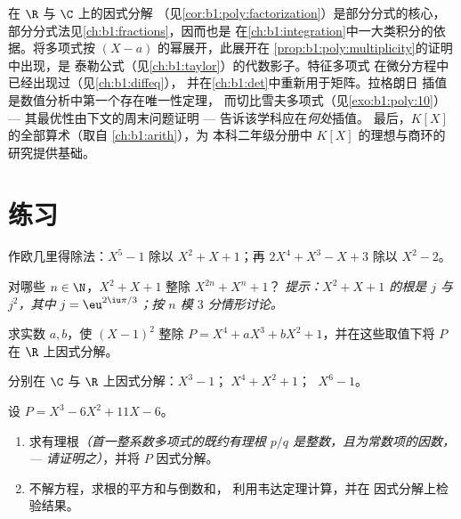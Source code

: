 \begin{remark}[本章的应用]\label{rem:b1:poly:whereused}
在 $\R$ 与 $\C$ 上的因式分解
（见\cref{cor:b1:poly:factorization}）是部分分式的核心，
部分分式法见\cref{ch:b1:fractions}，因而也是
在\cref{ch:b1:integration}中一大类积分的依据。将多项式按
$(X - a)$ 的幂展开，此展开在
\cref{prop:b1:poly:multiplicity}的证明中出现，是
泰勒公式（见\cref{ch:b1:taylor}）的代数影子。特征多项式
在微分方程中已经出现过（见\cref{ch:b1:diffeq}），
并在\cref{ch:b1:det}中重新用于矩阵。拉格朗日
插值是数值分析中第一个存在唯一性定理，
而切比雪夫多项式（见\cref{exo:b1:poly:10}）
--- 其最优性由下文的周末问题证明 ---
告诉该学科应在\emph{何处}插值。
最后，$K[X]$ 的全部算术（取自
\cref{ch:b1:arith}），为
本科二年级分册中 $K[X]$ 的理想与商环的研究提供基础。
\end{remark}

\section{练习}

\begin{exercise}[$\star$]\label{exo:b1:poly:1}
作欧几里得除法：$X^5 - 1$ 除以 $X^2 + X + 1$；再
$2X^4 + X^3 - X + 3$ 除以 $X^2 - 2$。
\end{exercise}

\begin{exercise}[$\star$]\label{exo:b1:poly:2}
对哪些 $n \in \N$，$X^2 + X + 1$ 整除 $X^{2n} + X^n + 1$？
\emph{提示：$X^2 + X + 1$ 的根是 $j$ 与 $j^2$，其中 $j =
\eu^{2\iu\pi/3}$；按 $n$ 模 $3$ 分情形讨论。}
\end{exercise}

\begin{exercise}[$\star$]\label{exo:b1:poly:3}
求实数 $a, b$，使 $(X-1)^2$ 整除 $P = X^4 + aX^3 +
bX^2 + 1$，并在这些取值下将 $P$ 在 $\R$ 上因式分解。
\end{exercise}

\begin{exercise}[$\star$]\label{exo:b1:poly:4}
分别在 $\C$ 与 $\R$ 上因式分解：$X^3 - 1$；$\;X^4 + X^2 + 1$；
$\;X^6 - 1$。
\end{exercise}

\begin{exercise}[$\star\star$]\label{exo:b1:poly:5}
设 $P = X^3 - 6X^2 + 11X - 6$。
\begin{enumerate}
  \item 求有理根\emph{（首一整系数多项式的既约有理根 $p/q$
        是整数，且为常数项的因数，
        --- 请证明之）}，并将 $P$ 因式分解。
  \item 不解方程，求根的平方和与倒数和，
        利用韦达定理计算，并在
        因式分解上检验结果。
\end{enumerate}
\end{exercise}

